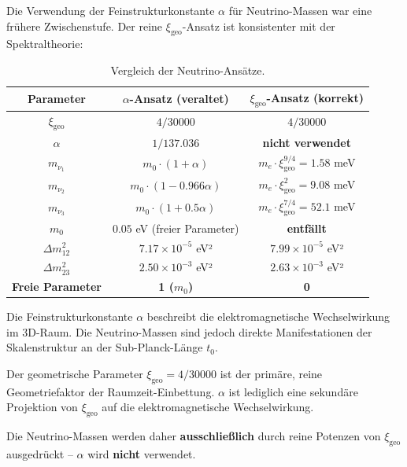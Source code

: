 \documentclass[11pt,a4paper]{article}
\newcommand{\xigeo}{\xi_{\text{geo}}}
\begin{document}
	Die Verwendung der Feinstrukturkonstante $\alpha$ für Neutrino-Massen war eine frühere Zwischenstufe. Der reine $\xigeo$-Ansatz ist konsistenter mit der Spektraltheorie:
	
	\begin{table}[h!]
		\centering
		\caption{Vergleich der Neutrino-Ansätze.}
		\label{tab:neutrino_comparison}
		\begin{tabular}{c c c}
			\toprule
			\textbf{Parameter} & $\alpha$-Ansatz (veraltet) & $\xigeo$-Ansatz (korrekt) \\
			\midrule
			$\xigeo$ & $4/30000$ & $4/30000$ \\
			$\alpha$ & $1/137.036$ & \textbf{nicht verwendet} \\
			$m_{\nu_1}$ & $m_0 \cdot (1 + \alpha)$ & $m_e \cdot \xigeo^{9/4} = 1.58$ meV \\
			$m_{\nu_2}$ & $m_0 \cdot (1 - 0.966\alpha)$ & $m_e \cdot \xigeo^{2} = 9.08$ meV \\
			$m_{\nu_3}$ & $m_0 \cdot (1 + 0.5\alpha)$ & $m_e \cdot \xigeo^{7/4} = 52.1$ meV \\
			$m_0$ & $0.05$ eV (freier Parameter) & \textbf{entfällt} \\
			$\Delta m_{12}^2$ & $7.17 \times 10^{-5}$ eV² & $7.99 \times 10^{-5}$ eV² \\
			$\Delta m_{23}^2$ & $2.50 \times 10^{-3}$ eV² & $2.63 \times 10^{-3}$ eV² \\
			\textbf{Freie Parameter} & \textbf{1 ($m_0$)} & \textbf{0} \\
			\bottomrule
		\end{tabular}
	\end{table}
	
	\begin{tcolorbox}[colback=yellow!5!white,colframe=orange!50!black,title=Warum $\alpha$ für Neutrinos nicht verwendet wird]
		Die Feinstrukturkonstante $\alpha$ beschreibt die elektromagnetische Wechselwirkung im 3D-Raum. Die Neutrino-Massen sind jedoch direkte Manifestationen der Skalenstruktur an der Sub-Planck-Länge $t_0$.
		
		Der geometrische Parameter $\xigeo = 4/30000$ ist der primäre, reine Geometriefaktor der Raumzeit-Einbettung. $\alpha$ ist lediglich eine sekundäre Projektion von $\xigeo$ auf die elektromagnetische Wechselwirkung.
		
		Die Neutrino-Massen werden daher \textbf{ausschließlich} durch reine Potenzen von $\xigeo$ ausgedrückt – $\alpha$ wird \textbf{nicht} verwendet.
	\end{tcolorbox}
	
\end{document}
